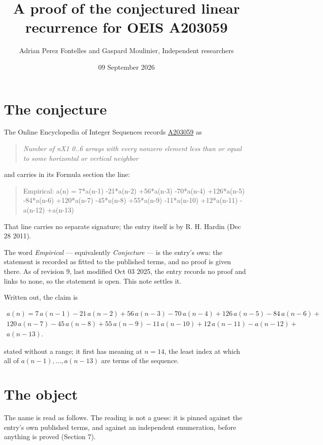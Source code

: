 \documentclass[11pt]{article}
\title{A proof of the conjectured linear recurrence for OEIS A203059}
\author{Adrian Perez Fontelles and Gaspard Moulinier, Independent researchers}
\date{09 September 2026}
\theoremstyle{definition}
\begin{document}
\maketitle
\section{The conjecture}

The Online Encyclopedia of Integer Sequences records \href{https://oeis.org/A203059}{A203059} as

\begin{quote}\itshape Number of nX1 0..6 arrays with every nonzero element less than or equal to some horizontal or vertical neighbor\end{quote}

and carries in its Formula section the line:

\begin{quote}\ttfamily Empirical: a(n) = 7*a(n-1) -21*a(n-2) +56*a(n-3) -70*a(n-4) +126*a(n-5) -84*a(n-6) +120*a(n-7) -45*a(n-8) +55*a(n-9) -11*a(n-10) +12*a(n-11) -a(n-12) +a(n-13)\end{quote}

That line carries no separate signature; the entry itself is by R. H. Hardin (Dec 28 2011).

The word {\itshape Empirical} --- equivalently {\itshape Conjecture} --- is the entry's own: the statement is recorded as fitted to the published terms, and no proof is given there. As of revision 9, last modified Oct 03 2025, the entry records no proof and links to none, so the statement is open. This note settles it.

Written out, the claim is

\begin{multline*} a(n) = 7\,a(n-1) - 21\,a(n-2) + 56\,a(n-3) - 70\,a(n-4) + 126\,a(n-5) - 84\,a(n-6) + \\ 120\,a(n-7) - 45\,a(n-8) + 55\,a(n-9) - 11\,a(n-10) + 12\,a(n-11) - a(n-12) + \\ a(n-13). \end{multline*}

stated without a range; it first has meaning at $n = 14$, the least index at which all of $a(n-1),\dots,a(n-13)$ are terms of the sequence.

\section{The object}

The name is read as follows. The reading is not a guess: it is pinned against the entry's own published terms, and against an independent enumeration, before anything is proved (Section 7).
\end{document}
